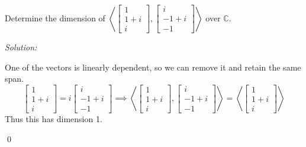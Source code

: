 \documentclass[12 pt]{article}
\newenvironment{problem}[2][Problem]{\begin{trivlist}
\item[\hskip \labelsep {\bfseries #1}\hskip \labelsep {\bfseries #2.}]}{\end{trivlist}}
\newenvironment{sol}
    {\emph{Solution:}
    }
    {
    \qed
    }
\theoremstyle{definition}
\newcommand{\C}{\mathbb{C}} %
\begin{document}

\begin{problem}{3.3.8f}
Determine the dimension of
$\left<\begin{bmatrix}
1\\1+i\\i
\end{bmatrix},\begin{bmatrix}
i\\-1+i\\-1
\end{bmatrix}  \right>$ over $\C$.
\end{problem}
\begin{sol}
One of the vectors is linearly dependent, so we can remove it and retain the same span.
\[\begin{bmatrix}
1\\1+i\\i
\end{bmatrix}
=
i\begin{bmatrix}
i\\-1+i\\-1
\end{bmatrix}\implies
\left<\begin{bmatrix}
1\\1+i\\i
\end{bmatrix},\begin{bmatrix}
i\\-1+i\\-1
\end{bmatrix}  \right >
=
\left<\begin{bmatrix}
1\\1+i\\i
\end{bmatrix}  \right >
\]
Thus this has dimension 1.
\end{sol}
\end{document}
